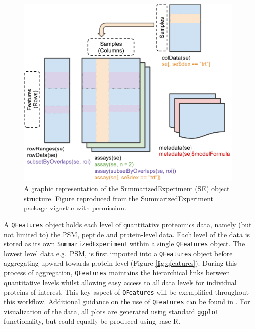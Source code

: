 \documentclass[9pt,a4paper,]{extarticle}
\begin{document}
\begin{figure}

{\centering \includegraphics[width=1\linewidth]{Images/summarized-experiment} 

}

\caption{A graphic representation of the SummarizedExperiment (SE) object structure. Figure reproduced from the SummarizedExperiment package \citep{SumExp} vignette with permission.}\label{fig:summarized-experiment}
\end{figure}

A \texttt{QFeatures} object holds each level of quantitative proteomics data, namely
(but not limited to) the PSM, peptide and protein-level data. Each level of the
data is stored as its own \texttt{SummarizedExperiment} within a single \texttt{QFeatures}
object. The lowest level data e.g.~PSM, is first imported into a \texttt{QFeatures}
object before aggregating upward towards protein-level (Figure
\ref{fig:qfeatures}). During this process of aggregation, \texttt{QFeatures} maintains
the hierarchical links between quantitative levels whilst allowing easy access
to all data levels for individual proteins of interest. This key aspect of
\texttt{QFeatures} will be exemplified throughout this workflow. Additional guidance on
the use of \texttt{QFeatures} can be found in \citep{QFeat}. For visualization of the data,
all plots are generated using standard \texttt{ggplot} functionality, but could equally
be produced using base R.
\end{document}
